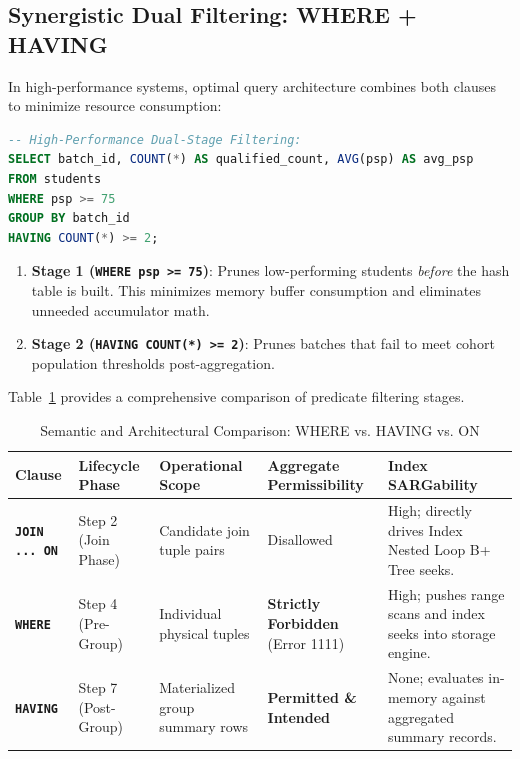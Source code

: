 \documentclass[10pt,twocolumn,letterpaper]{article}
\begin{document}
\subsection{Synergistic Dual Filtering: WHERE + HAVING}
In high-performance systems, optimal query architecture combines both clauses to minimize resource consumption:
\begin{lstlisting}[language=SQL]
-- High-Performance Dual-Stage Filtering:
SELECT batch_id, COUNT(*) AS qualified_count, AVG(psp) AS avg_psp
FROM students
WHERE psp >= 75
GROUP BY batch_id
HAVING COUNT(*) >= 2;
\end{lstlisting}
\begin{enumerate}
    \item \textbf{Stage 1 (\texttt{WHERE psp >= 75})}: Prunes low-performing students \textit{before} the hash table is built. This minimizes memory buffer consumption and eliminates unneeded accumulator math.
    \item \textbf{Stage 2 (\texttt{HAVING COUNT(*) >= 2})}: Prunes batches that fail to meet cohort population thresholds post-aggregation.
\end{enumerate}

Table~\ref{tab:where_vs_having} provides a comprehensive comparison of predicate filtering stages.

\begin{table}[htbp]
\caption{Semantic and Architectural Comparison: WHERE vs. HAVING vs. ON}
\label{tab:where_vs_having}
\centering
\scriptsize
\begin{tabular}{p{2.4cm}p{2.0cm}p{3.0cm}p{3.0cm}p{4.0cm}}
\toprule
\textbf{Clause} & \textbf{Lifecycle Phase} & \textbf{Operational Scope} & \textbf{Aggregate Permissibility} & \textbf{Index SARGability} \\
\midrule
\textbf{\texttt{JOIN ... ON}} & Step 2 (Join Phase) & Candidate join tuple pairs & Disallowed & High; directly drives Index Nested Loop B+ Tree seeks. \\
\textbf{\texttt{WHERE}} & Step 4 (Pre-Group) & Individual physical tuples & \textbf{Strictly Forbidden} (Error 1111) & High; pushes range scans and index seeks into storage engine. \\
\textbf{\texttt{HAVING}} & Step 7 (Post-Group) & Materialized group summary rows & \textbf{Permitted \& Intended} & None; evaluates in-memory against aggregated summary records. \\
\bottomrule
\end{tabular}
\end{table}
\end{document}
